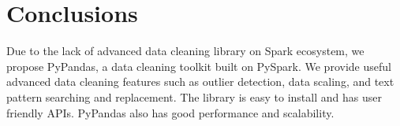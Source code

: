 \documentclass[sigconf]{acmart}
\begin{document}
\section{Conclusions}
Due to the lack of advanced data cleaning library on Spark ecosystem, we propose PyPandas, a data cleaning toolkit built on PySpark. We provide useful advanced data cleaning features such as outlier detection, data scaling, and text pattern searching and replacement. The library is easy to install and has user friendly APIs. PyPandas also has good performance and scalability.



\end{document}
